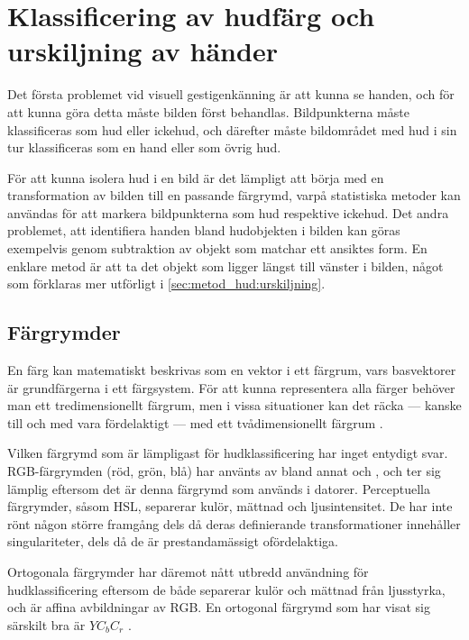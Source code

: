 \documentclass[../rapport_MVEX01-11-05]{subfiles}
\begin{document}
\section{Klassificering av hudfärg och urskiljning av händer}\label{sec:hudklassificering}
Det första problemet vid visuell gestigenkänning är att kunna se handen,
och för att kunna göra detta
måste bilden först behandlas. Bildpunkterna måste klassificeras som hud 
eller ickehud, och därefter måste bildområdet med hud i sin tur 
klassificeras som en hand eller som övrig hud.

För att kunna isolera hud i en bild är det lämpligt att börja med
en transformation av bilden till en
passande färgrymd, varpå statistiska metoder kan användas för att
markera bildpunkterna som hud respektive ickehud.
Det andra problemet, att identifiera handen bland hudobjekten i bilden kan göras
exempelvis genom subtraktion av objekt som matchar ett ansiktes form. En enklare
metod är att ta det objekt som ligger längst till vänster i bilden, 
något som förklaras mer utförligt i \ref{sec:metod_hud:urskiljning}.

\subsection{Färgrymder}\label{sec:klassificering:fargrymder}
En färg kan matematiskt beskrivas som en vektor i ett färgrum, vars
basvektorer är grundfärgerna i ett färgsystem.
För att kunna representera alla färger
behöver man ett tredimensionellt färgrum, men i vissa situationer kan
det räcka --- kanske till och med vara fördelaktigt --- med ett
tvådimensionellt färgrum \cite{Kakumanu07}.

Vilken färgrymd som är lämpligast för hudklassificering har inget
entydigt svar.
RGB-färgrymden (röd, grön, blå) har använts av bland annat
 och , och ter sig lämplig
eftersom det är denna färgrymd som används i datorer. Perceptuella
färgrymder, såsom HSL, separerar kulör, mättnad och ljusintensitet.
De har inte rönt någon större framgång dels då deras definierande
transformationer innehåller singulariteter, dels då de är
prestandamässigt ofördelaktiga.

Ortogonala färgrymder har däremot nått utbredd användning för
hudklassificering \cite{Hsu02,Elmezain08,Hassanpour08} eftersom de
både separerar kulör och mättnad från ljusstyrka, och är affina avbildningar av
RGB. 
En ortogonal färgrymd som har visat sig särskilt bra är $YC_bC_r$ \cite{Kakumanu07}.
\end{document}
